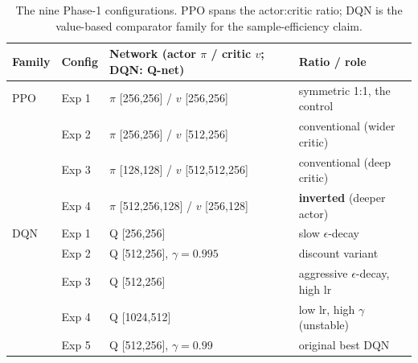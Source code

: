\begin{table}[!htbp]
\caption{The nine Phase-1 configurations. PPO spans the actor:critic ratio; DQN is the
value-based comparator family for the sample-efficiency claim.}
\label{tab:configs}
\centering
\small
\begin{tabular}{llll}
\toprule
Family & Config & Network (actor $\pi$ / critic $v$; DQN: Q-net) & Ratio / role \\
\midrule
PPO & Exp 1 & $\pi$ [256,256] / $v$ [256,256] & symmetric 1:1, the control \\
 & Exp 2 & $\pi$ [256,256] / $v$ [512,256] & conventional (wider critic) \\
 & Exp 3 & $\pi$ [128,128] / $v$ [512,512,256] & conventional (deep critic) \\
 & Exp 4 & $\pi$ [512,256,128] / $v$ [256,128] & \textbf{inverted} (deeper actor) \\
\midrule
DQN & Exp 1 & Q [256,256] & slow $\epsilon$-decay \\
 & Exp 2 & Q [512,256], $\gamma=0.995$ & discount variant \\
 & Exp 3 & Q [512,256] & aggressive $\epsilon$-decay, high lr \\
 & Exp 4 & Q [1024,512] & low lr, high $\gamma$ (unstable) \\
 & Exp 5 & Q [512,256], $\gamma=0.99$ & original best DQN \\
\bottomrule
\end{tabular}
\end{table}

